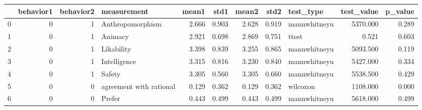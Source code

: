 \begin{tabular}{lrrlrrrrlrr}
\toprule
{} &  behavior1 &  behavior2 &              measurement &  mean1 &   std1 &  mean2 &   std2 &     test\_type &  test\_value &  p\_value \\
\midrule
0 &          0 &          1 &         Anthropomorphism &  2.666 &  0.903 &  2.628 &  0.919 &  mannwhitneyu &    5370.000 &    0.289 \\
1 &          0 &          1 &                  Animacy &  2.921 &  0.698 &  2.869 &  0.751 &         ttest &       0.521 &    0.603 \\
2 &          0 &          1 &               Likability &  3.398 &  0.839 &  3.255 &  0.865 &  mannwhitneyu &    5093.500 &    0.119 \\
3 &          0 &          1 &             Intelligence &  3.315 &  0.816 &  3.230 &  0.840 &  mannwhitneyu &    5427.000 &    0.334 \\
4 &          0 &          1 &                   Safety &  3.305 &  0.560 &  3.305 &  0.660 &  mannwhitneyu &    5538.500 &    0.429 \\
5 &          0 &          0 &  agreement with rational &  0.129 &  0.362 &  0.129 &  0.362 &      wilcoxon &    1108.000 &    0.000 \\
6 &          0 &          0 &                   Prefer &  0.443 &  0.499 &  0.443 &  0.499 &  mannwhitneyu &    5618.000 &    0.499 \\
\bottomrule
\end{tabular}
